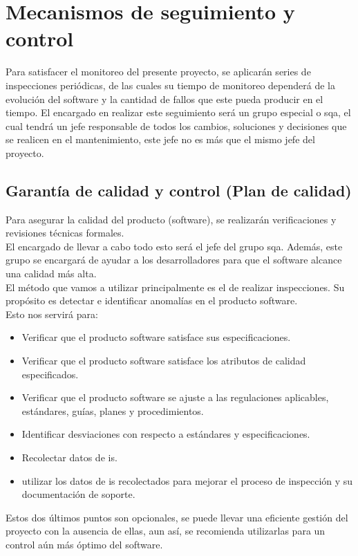 \section{Mecanismos de seguimiento y control}
Para satisfacer el monitoreo del presente proyecto, se aplicarán series de inspecciones periódicas, de las cuales su tiempo de monitoreo dependerá de la evolución del software y la cantidad de fallos que este pueda producir en el tiempo. El encargado en realizar este seguimiento será un grupo especial o \gls{sqa}, el cual tendrá un jefe responsable de todos los cambios, soluciones y decisiones que se realicen en el mantenimiento, este jefe no es más que el mismo jefe del proyecto.

\subsection{Garantía de calidad y control (Plan de calidad)}
Para asegurar la calidad del producto (software), se realizarán verificaciones y revisiones técnicas formales.\\
El encargado de llevar a cabo todo esto será el jefe del grupo \gls{sqa}. Además, este grupo se encargará de ayudar a los desarrolladores para que el software alcance una calidad más alta.\\
El método que vamos a utilizar principalmente es el de realizar inspecciones. Su propósito es detectar e identificar anomalías en el producto software.\\
Esto nos servirá para:
\begin{itemize}
	\item  Verificar que el producto software satisface sus especificaciones.
	\item  Verificar que el producto software satisface los atributos de calidad especificados.
	\item Verificar que el producto software se ajuste a las regulaciones aplicables, estándares, guías, planes y procedimientos.
	\item  Identificar desviaciones con respecto a estándares y especificaciones.
	\item Recolectar datos de \gls{is}.
	\item utilizar los datos de \gls{is} recolectados para mejorar el proceso de inspección y su documentación de soporte.
\end{itemize}
Estos dos últimos puntos son opcionales, se puede llevar una eficiente gestión del proyecto con la ausencia de ellas, aun así, se recomienda utilizarlas para un control aún más óptimo del software.


